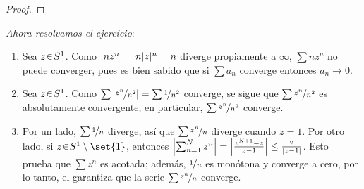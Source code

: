 \begin{sol}
\begin{lema}
\begin{proof}
\end{proof}
\end{lema}
\emph{Ahora resolvamos el ejercicio}:
\begin{enumerate}[label=(\alph*), leftmargin=1.8em]
\item 
Sea $z\en S^1$. Como $\abs{nz^n} = n|z|^n = n$ diverge propiamente a $\infty$, $\sum nz^n$ no puede converger, pues es bien sabido que si $\sum a_n$ converge entonces $a_n \to 0$.
\item 
Sea $z\en S^1$. Como $\sum \abs{\nicefrac{z^n}{n^2}} = \sum\nicefrac{1}{n^2}$ converge, se sigue que $\sum \nicefrac{z^n}{n^2}$ es absolutamente convergente; en particular, $\sum \nicefrac{z^n}{n^2}$ converge.
\item 
Por un lado, $\sum\nicefrac{1}{n}$ diverge, así que $\sum \nicefrac{z^n}{n}$ diverge cuando $z=1$. Por otro lado, si $z\en S^1\setminus\set{1}$, entonces $\abs{\sum^N_{n=1}z^n} = \abs{\frac{z^{N+1} - z}{z-1}} \leq \frac{2}{\abs{z-1}}$. Esto prueba que $\sum z^n$ es acotada; además, $\nicefrac{1}{n}$ es monótona y converge a cero, por lo tanto, el  garantiza que la serie $\sum \nicefrac{z^n}{n}$ converge.\qedhere
\end{enumerate}
\end{sol}